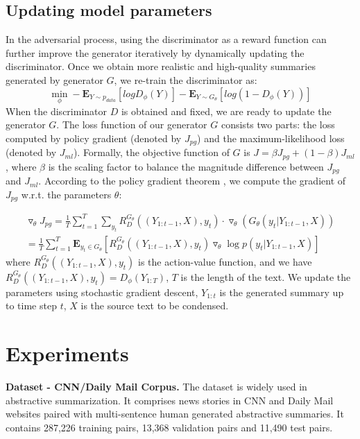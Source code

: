 \documentclass[letterpaper]{article} \usepackage{aaai18}  \usepackage{times}  \usepackage{helvet}  \usepackage{courier}  \usepackage{url}  \usepackage{graphicx}  \frenchspacing  \usepackage{multirow}
\begin{document}
\subsection{Updating model parameters}
In the adversarial process, using the discriminator as a reward function can further improve the generator iteratively by dynamically updating the discriminator. Once we obtain more realistic and high-quality summaries generated by generator $G$, we re-train the discriminator as:  
{\scriptsize
	\begin{equation}
	\min_{\phi} -\mathbf{E}_{Y\sim p_{data}}[log D_{\phi}(Y)] - \mathbf{E}_{Y\sim G_{\theta}}[log(1- D_{\phi}(Y))] \nonumber
	\end{equation}
}
When the discriminator $D$ is obtained and fixed, we are ready to update the generator $G$. The loss function of our generator $G$ consists two parts: the loss computed by policy gradient (denoted by $J_{pg}$) and the maximum-likelihood loss (denoted by $J_{ml}$). 
Formally, the objective function of $G$ is $J=\beta J_{pg} + (1-\beta) J_{ml}$, where $\beta$ is the scaling factor to balance the magnitude difference between $J_{pg}$ and $J_{ml}$.  According to the policy gradient theorem \cite{sutton2000policy},  we compute the gradient of $J_{pg}$  w.r.t. the parameters $\theta$:

{\scriptsize
	\begin{align}
	\triangledown_{\theta} J_{pg}= \frac{1}{T} \sum_{t=1}^{T} \sum_{y_{t}} R_{D}^{G_{\theta}}((Y_{1:t-1}, X), y_{t}) \cdot \triangledown_{\theta}(G_{\theta}(y_{t}|Y_{1:t-1}, X)) \nonumber\\
	= \frac{1}{T} \sum_{t=1}^{T} \mathbf{E}_{y_{t}\in G_{\theta} } [R_{D}^{G_{\theta}}((Y_{1:t-1}, X), y_{t}) 
	\triangledown_{\theta} \log p(y_{t}|Y_{1:t-1}, X)] \nonumber
	\end{align}
}
where $R_{D}^{G_{\theta}}((Y_{1:t-1}, X), y_{t})$ is the action-value function, and we have $R_{D}^{G_{\theta}}((Y_{1:t-1}, X), y_{t})={D_{\phi}}(Y_{1:T})$, $T$ is the length of the text. We update the parameters using stochastic gradient descent, $Y_{1:t}$ is the generated summary up to time step $t$,  $X$ is the source text to be condensed. 

\section{Experiments}

\textbf{Dataset - CNN/Daily Mail Corpus.} The dataset \cite{nallapati2016abstractive} is widely used in abstractive summarization. It comprises news stories in CNN and Daily Mail websites paired with multi-sentence human generated abstractive summaries. It contains 287,226 training pairs, 13,368 validation pairs and 11,490 test pairs. 
\end{document}
